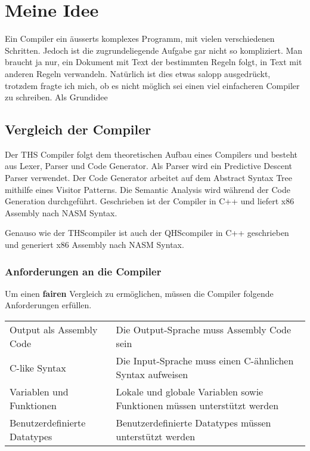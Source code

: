 \chapter{Meine Idee}
Ein Compiler ein äusserts komplexes Programm, mit vielen verschiedenen Schritten. Jedoch ist die zugrundeliegende Aufgabe gar nicht so kompliziert.
Man braucht ja nur, ein Dokument mit Text der bestimmten Regeln folgt, in Text mit anderen Regeln verwandeln. Natürlich ist dies etwas salopp ausgedrückt, trotzdem fragte ich mich,
ob es nicht möglich sei einen viel einfacheren Compiler zu schreiben. Als Grundidee 

\section{Vergleich der Compiler}
Der THS Compiler folgt dem theoretischen Aufbau eines Compilers und besteht aus Lexer, Parser und Code Generator. Als Parser wird ein Predictive Descent Parser verwendet.
Der Code Generator arbeitet auf dem Abstract Syntax Tree mithilfe eines Visitor Patterns. Die Semantic Analysis wird während der Code Generation durchgeführt. Geschrieben ist der Compiler in C++ und liefert x86 Assembly nach NASM Syntax.

Genauso wie der THScompiler ist auch der QHScompiler in C++ geschrieben und generiert x86 Assembly nach NASM Syntax.

\subsection{Anforderungen an die Compiler}
Um einen \textbf{fairen} Vergleich zu ermöglichen, müssen die Compiler folgende Anforderungen erfüllen.

\begin{table}[h]
    \begin{tabular}{l|l}
    Output als Assembly Code     & Die Output-Sprache muss Assembly Code sein                               \\
    C-like Syntax                & Die Input-Sprache muss einen C-ähnlichen Syntax aufweisen                \\
    Variablen und Funktionen     & Lokale und globale Variablen sowie Funktionen müssen unterstützt werden  \\
    Benutzerdefinierte Datatypes & Benutzerdefinierte Datatypes müssen unterstützt werden                                 
    \end{tabular}
\end{table}

